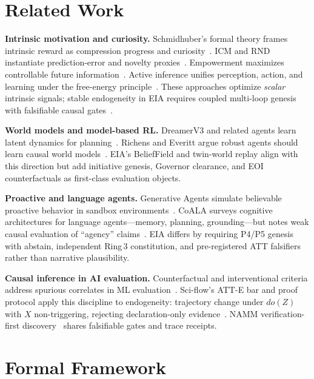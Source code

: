 \documentclass[11pt,a4paper]{article}
\theoremstyle{definition}
\begin{document}
\section{Related Work}\label{sec:related}
\textbf{Intrinsic motivation and curiosity.} Schmidhuber's formal theory frames intrinsic reward as compression progress and curiosity~\cite{schmidhuber2010curiosity}. ICM and RND instantiate prediction-error and novelty proxies~\cite{pathak2017curiosity,burda2019large}. Empowerment maximizes controllable future information~\cite{mohamed2015empowerment}. Active inference unifies perception, action, and learning under the free-energy principle~\cite{parr2022active}. These approaches optimize \emph{scalar} intrinsic signals; stable endogeneity in EIA requires coupled multi-loop genesis with falsifiable causal gates~\cite{kuznetsov2026stable}.

\textbf{World models and model-based RL.} DreamerV3 and related agents learn latent dynamics for planning~\cite{hafner2023mastering}. Richens and Everitt argue robust agents should learn causal world models~\cite{richens2024world}. EIA's BeliefField and twin-world replay align with this direction but add initiative genesis, Governor clearance, and EOI counterfactuals as first-class evaluation objects.

\textbf{Proactive and language agents.} Generative Agents simulate believable proactive behavior in sandbox environments~\cite{park2023generative}. CoALA surveys cognitive architectures for language agents---memory, planning, grounding---but notes weak causal evaluation of ``agency'' claims~\cite{sumers2024cala}. EIA differs by requiring P4/P5 genesis with abstain, independent Ring\,3 constitution, and pre-registered ATT falsifiers rather than narrative plausibility.

\textbf{Causal inference in AI evaluation.} Counterfactual and interventional criteria address spurious correlates in ML evaluation~\cite{veitch2021counterfactual,pearl2009causality}. Sci-flow's ATT-E bar and proof protocol apply this discipline to endogeneity: trajectory change under $do(Z)$ with $X$ non-triggering, rejecting declaration-only evidence~\cite{kuznetsov2026causal,kuznetsov2026proof}. NAMM verification-first discovery~\cite{kuznetsov2026namm} shares falsifiable gates and trace receipts.

\section{Formal Framework}\label{sec:formal}
\end{document}
